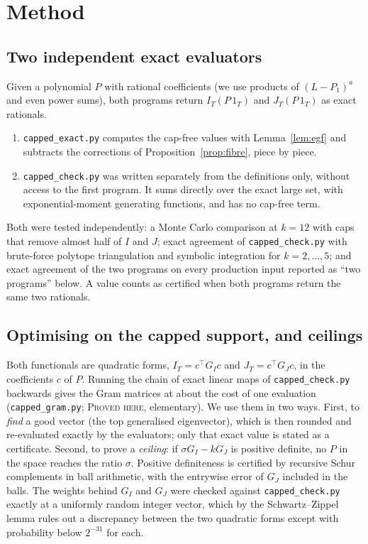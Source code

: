 \documentclass[11pt]{amsart}
\theoremstyle{definition}
\theoremstyle{remark}
\newcommand{\lbl}[1]{\textup{\textsc{#1}}}
\begin{document}
\section{Method}

\subsection*{Two independent exact evaluators}
Given a polynomial $P$ with rational coefficients (we use products of
$(L-P_1)^a$ and even power sums), both programs return $I_T(P\,1_T)$ and
$J_T(P\,1_T)$ as exact rationals.
\begin{enumerate}
\item \texttt{capped\_exact.py} computes the cap-free values with
Lemma~\ref{lem:egf} and subtracts the corrections of
Proposition~\ref{prop:fibre}, piece by piece.
\item \texttt{capped\_check.py} was written separately from the definitions
only, without access to the first program. It sums directly over the exact
large set, with exponential-moment generating functions, and has no cap-free
term.
\end{enumerate}
Both were tested independently: a Monte Carlo comparison at $k=12$ with caps
that remove almost half of $I$ and $J$; exact agreement of
\texttt{capped\_check.py} with brute-force polytope triangulation and symbolic
integration for $k=2,\dots,5$; and exact agreement of the two programs on every
production input reported as ``two programs'' below. A value counts as
certified when both programs return the same two rationals.

\subsection*{Optimising on the capped support, and ceilings}
Both functionals are quadratic forms, $I_T=c^\top G_Ic$ and $J_T=c^\top G_Jc$,
in the coefficients $c$ of $P$. Running the chain of exact linear maps of
\texttt{capped\_check.py} backwards gives the Gram matrices at about the cost
of one evaluation (\texttt{capped\_gram.py}; \lbl{Proved here}, elementary).
We use them in two ways. First, to \emph{find} a good vector (the top
generalised eigenvector), which is then rounded and re-evaluated exactly by
the evaluators; only that exact value is stated as a certificate. Second, to
prove a \emph{ceiling}: if $\sigma G_I-kG_J$ is positive definite, no $P$ in
the space reaches the ratio $\sigma$. Positive definiteness is certified by
recursive Schur complements in ball arithmetic, with the entrywise error of
$G_J$ included in the balls. The weights behind $G_I$ and $G_J$ were checked
against \texttt{capped\_check.py} exactly at a uniformly random integer
vector, which by the Schwartz--Zippel lemma rules out a discrepancy between
the two quadratic forms except with probability below $2^{-31}$ for each.
\end{document}
